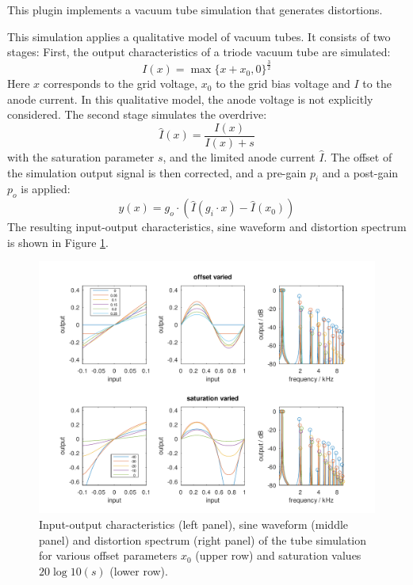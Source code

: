 This plugin implements a vacuum tube simulation that generates distortions.

This simulation applies a qualitative model of vacuum tubes. It consists of two stages: First, the output characteristics of a triode vacuum tube are simulated:
%
\begin{equation}
  I(x) = \max\{x+x_0,0\}^{\frac32}
\end{equation}
%
Here $x$ corresponds to the grid voltage, $x_0$ to the grid bias voltage and $I$ to the anode current. In this qualitative model, the anode voltage is not explicitly considered.
%
The second stage simulates the overdrive:
\begin{equation}
  \hat I(x) = \frac{I(x)}{I(x)+s}
\end{equation}
with the saturation parameter $s$, and the limited anode current $\hat I$.
%
The offset of the simulation output signal is then corrected, and a pre-gain $p_i$ and a post-gain $p_o$ is applied:
\begin{equation}
  y(x) = g_o \cdot \left(\hat I \left(g_i \cdot x \right) - \hat I\left(x_0\right)\right)
\end{equation}
%
The resulting input-output characteristics, sine waveform and distortion spectrum is shown in Figure \ref{fig:tubesim}.

\begin{figure}[htb]
  \includegraphics[width=\textwidth]{tubesim.pdf}
  \caption{Input-output characteristics (left panel), sine waveform (middle panel) and distortion spectrum (right panel) of the tube simulation for various offset parameters $x_0$ (upper row) and saturation values $20\log10(s)$ (lower row).}\label{fig:tubesim}
\end{figure}


